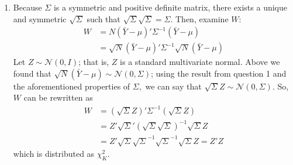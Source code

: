 \documentclass{article}[12pt]
\begin{document}
\begin{enumerate}
	\item Because $\Sigma$ is a symmetric and positive definite matrix, there exists a unique and symmetric $\sqrt{\Sigma}$ such that $\sqrt{\Sigma}\sqrt{\Sigma} = \Sigma$. Then, examine $W$:
	\begin{align*}
		W &= N (\bar{Y} - \mu)' \Sigma^{-1} (\bar{Y} - \mu) \\
		&= \sqrt{N} (\bar{Y} - \mu)' \Sigma^{-1} \sqrt{N} (\bar{Y} - \mu)
	\end{align*}
	Let $Z \sim \mathscr{N}(0,I)$; that is, $Z$ is a standard multivariate normal. Above we found that $\sqrt{N} (\bar{Y} - \mu) \sim \mathscr{N}(0,\Sigma)$; using the result from question 1 and the aforementioned properties of $\Sigma,$ we can say that $\sqrt{\Sigma} Z \sim \mathscr{N}(0,\Sigma)$. So, $W$ can be rewritten as
	\begin{align*}
		W &= (\sqrt{\Sigma} Z)' \Sigma^{-1} (\sqrt{\Sigma} Z) \\
		&= Z'\sqrt{\Sigma}' (\sqrt{\Sigma}\sqrt{\Sigma})^{-1} \sqrt{\Sigma} Z \\
		&= Z'\sqrt{\Sigma} \sqrt{\Sigma}^{-1} \sqrt{\Sigma}^{-1} \sqrt{\Sigma} Z = Z' Z
	\end{align*}
	which is distributed as $\chi^2_{K}$.

	\end{enumerate}
\end{document}
